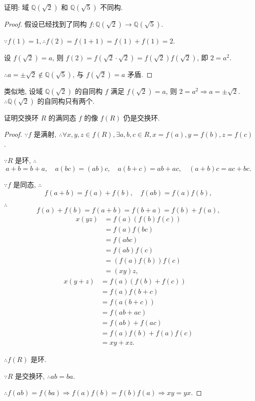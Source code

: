 \documentclass[color=black,device=normal,lang=cn,mode=geye]{elegantnote}
\begin{document}
\begin{exercise}%
    证明: 域 $\mathbb{Q}(\sqrt{2})$ 和 $\mathbb{Q}(\sqrt{5})$ 不同构.
\end{exercise}
\begin{proof}
    假设已经找到了同构 $f:\mathbb{Q}(\sqrt{2})\to\mathbb{Q}(\sqrt{5})$.

    $\because f(1)=1,\therefore f(2)=f(1+1)=f(1)+f(1)=2$.

    设 $f(\sqrt{2})=a$, 则 $f(2)=f(\sqrt{2}\cdot\sqrt{2})=f(\sqrt{2})f(\sqrt{2})$, 即 $2=a^2$.

    $\therefore a=\pm\sqrt{2}\notin\mathbb{Q}(\sqrt{5})$, 与 $f(\sqrt{2})=a$ 矛盾.
\end{proof}
\begin{note}
    类似地, 设域 $\mathbb{Q}(\sqrt{2})$ 的自同构 $f$ 满足 $f(\sqrt{2})=a$, 则 $2=a^2\Rightarrow a=\pm\sqrt{2}$. $\therefore\mathbb{Q}(\sqrt{2})$ 的自同构只有两个.
\end{note}
\begin{exercise}%
    证明交换环 $R$ 的满同态 $f$ 的像 $f(R)$ 仍是交换环.
\end{exercise}
\begin{proof}
    $\because f$ 是满射, $\therefore\forall x,y,z\in f(R),\exists a,b,c\in R,x=f(a),y=f(b),z=f(c)$.

    $\because R$ 是环, $\therefore$
    \[a+b=b+a,\quad a(bc)=(ab)c,\quad a(b+c)=ab+ac,\quad(a+b)c=ac+bc.\]

    $\because f$ 是同态, $\therefore$
    \[f(a+b)=f(a)+f(b),\quad f(ab)=f(a)f(b),\]

    $\therefore$
    \[f(a)+f(b)=f(a+b)=f(b+a)=f(b)+f(a),\]
    \begin{align*}
        x(yz) & =f(a)(f(b)f(c)) \\
        & =f(a)f(bc) \\
        & =f(abc) \\
        & =f(ab)f(c) \\
        & =(f(a)f(b))f(c) \\
        & =(xy)z,
    \end{align*}
    \begin{align*}
        x(y+z) & =f(a)(f(b)+f(c)) \\
        & =f(a)f(b+c) \\
        & =f(a(b+c)) \\
        & =f(ab+ac) \\
        & =f(ab)+f(ac) \\
        & =f(a)f(b)+f(a)f(c) \\
        & =xy+xz.
    \end{align*}

    $\therefore f(R)$ 是环.

    $\because R$ 是交换环, $\therefore ab=ba$.

    $\therefore f(ab)=f(ba)\Rightarrow f(a)f(b)=f(b)f(a)\Rightarrow xy=yx$.
\end{proof}
\end{document}

